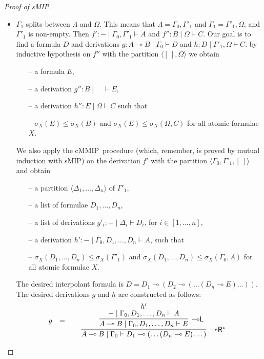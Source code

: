 \documentclass[sn-mathphys-num]{sn-jnl}%
\newcommand{\GG}{\Gamma}
\newcommand{\GD}{\Delta}
\newcommand{\GL}{\Lambda}
\newcommand{\GO}{\Omega}
\newcommand{\vd}{\vdash}
\newcommand{\lolli}{\multimap}
\newcommand{\lleft}{{\lolli}\mathsf{L}}
\newcommand{\lright}{{\lolli}\mathsf{R}}
\newcommand{\proofbox}[1]{\begin{tabular}{l} #1 \end{tabular}}
\newcommand{\mf}[1]{\mathsf{#1}}
\newcommand{\gs}[1]{\sigma_{X} (#1)}
\newcommand{\vars}[1]{\mf{var} (#1)}
\newcommand{\sMIP}{\textsf{sMIP}}
\newcommand{\cMMIP}{\textsf{cMMIP}}
\theoremstyle{thmstyleone}%
\theoremstyle{thmstyletwo}%
\theoremstyle{thmstylethree}%
\begin{document}
\begin{proof}[Proof of \sMIP]
\begin{itemize}
    \item $\GG_1$ splits between $\GL$ and $\GO$. 
    This means that $\GL = \GG_0,\GG'_1$ and $\GG_1 = \GG'_1,\GO$, and $\GG'_1$ is non-empty.
    Then $f' : {-} \mid \GG_0,\GG'_1 \vd A$ and $f'': B \mid \GO \vd C$.
    Our goal is to find a formula $D$ and derivations $g : A\lolli B \mid \GG_0 \vd D$ and $h: D \mid \GG'_1, \GO \vd C$.
    by inductive hypothesis on $f''$ with the partition $\langle [\ ] , \GO \rangle$ we obtain
    \begin{itemize}
      \item[--] a formula $E$,
      \item[--] a derivation $g'' : B \mid \quad \vd E$,
      \item[--] a derivation $h'': E \mid \GO \vd C$ such that
      \item[--] $\gs{E} \leq \gs{B} $ and $ \gs{E} \leq \gs{\GO , C}$ for all atomic formulae $X$.
    \end{itemize}
    We also apply the \cMMIP~procedure (which, remember, is proved by mutual induction with \sMIP) on the derivation $f'$ with the partition $\langle \GG_0 , \GG'_1 , [\ ]\rangle$ and obtain
    \begin{itemize}
      \item[--]  a partition $\langle \GD_1, \dots , \GD_n \rangle$ of $\GG'_1$,
      \item[--] a list of formulae $D_1 , \dots , D_n$,
      \item[--] a list of derivations $g'_i : {-} \mid \GD_i \vd D_i$, for $i \in [1, \dots, n]$,
      \item[--] a derivation $h': {-} \mid \GG_0 , D_1, \dots, D_n \vd A$, such that
      \item[--] $\gs{D_1, \dots, D_n} \leq \gs{\GG'_1} $ and $\gs{D_1, \dots, D_n} \leq \gs{\GG_0 , A}$ for all atomic formulae $X$.
    \end{itemize}
    The desired interpolant formula is $D = D_1 \lolli (D_2 \lolli (\dots (D_n \lolli E)\dots))$.
    The desired derivations $g$ and $h$ are constructed as follows:
    \begin{displaymath}
      \begin{array}{rcl}
        g 
        &=&
        \proofbox{
        \infer[\lright^*]{A\lolli B \mid \GG_0 \vd D_1 \lolli (\dots (D_n \lolli E)\dots)}{
        \infer[\lleft]{A \lolli B \mid \GG_0 , D_1, \dots, D_n \vd E}{
        \deduce{{-} \mid \GG_0 , D_1, \dots, D_n \vd A}{h'}
}}}
\end{array}
\end{displaymath}
\end{itemize}
\end{proof}
\end{document}

